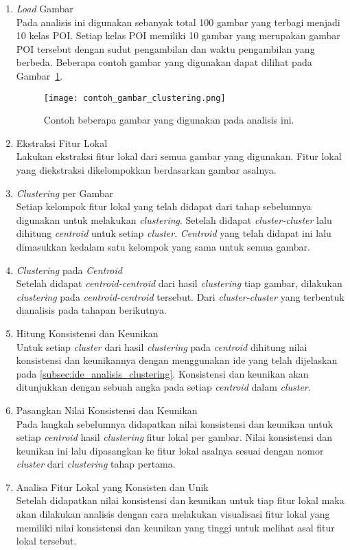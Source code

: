 \begin{enumerate}
	\item \textit{Load} Gambar \\
	Pada analisis ini digunakan sebanyak total 100 gambar yang terbagi menjadi 10 kelas POI. Setiap kelas POI memiliki 10 gambar yang merupakan gambar POI tersebut dengan sudut pengambilan dan waktu pengambilan yang berbeda. Beberapa contoh gambar yang digunakan dapat dilihat pada Gambar~\ref{fig:gambar_analisis_clustering}.
	\begin{figure}[H]
		\centering
		\texttt{[image: contoh\_gambar\_clustering.png]}
		\caption{Contoh beberapa gambar yang digunakan pada analisis ini.}
		\label{fig:gambar_analisis_clustering}
	\end{figure}
	\item Ekstraksi Fitur Lokal \\
	Lakukan ekstraksi fitur lokal dari semua gambar yang digunakan. Fitur lokal yang diekstraksi dikelompokkan berdasarkan gambar asalnya.
	\item \textit{Clustering} per Gambar \\
	Setiap kelompok fitur lokal yang telah didapat dari tahap sebelumnya digunakan untuk melakukan \textit{clustering}. Setelah didapat \textit{cluster-cluster} lalu dihitung \textit{centroid} untuk setiap \textit{cluster}. \textit{Centroid} yang telah didapat ini lalu dimasukkan kedalam satu kelompok yang sama untuk semua gambar.
	\item \textit{Clustering} pada \textit{Centroid} \\
	Setelah didapat \textit{centroid-centroid} dari hasil \textit{clustering} tiap gambar, dilakukan \textit{clustering} pada \textit{centroid-centroid} tersebut. Dari \textit{cluster-cluster} yang terbentuk dianalisis pada tahapan berikutnya.
	\item Hitung Konsistensi dan Keunikan \\
	Untuk setiap \textit{cluster} dari hasil \textit{clustering} pada \textit{centroid} dihitung nilai konsistensi dan keunikannya dengan menggunakan ide yang telah dijelaskan pada \ref{subsec:ide_analisis_clustering}. Konsistensi dan keunikan akan ditunjukkan dengan sebuah angka pada setiap \textit{centroid} dalam \textit{cluster}.
	\item Pasangkan Nilai Konsistensi dan Keunikan \\
	Pada langkah sebelumnya didapatkan nilai konsistensi dan keunikan untuk setiap \textit{centroid} hasil \textit{clustering} fitur lokal per gambar. Nilai konsistensi dan keunikan ini lalu dipasangkan ke fitur lokal asalnya sesuai dengan nomor \textit{cluster} dari \textit{clustering} tahap pertama.
	\item Analisa Fitur Lokal yang Konsisten dan Unik \\
	Setelah didapatkan nilai konsistensi dan keunikan untuk tiap fitur lokal maka akan dilakukan analisis dengan cara melakukan visualisasi fitur lokal yang memiliki nilai konsistensi dan keunikan yang tinggi untuk melihat asal fitur lokal tersebut.
\end{enumerate}

